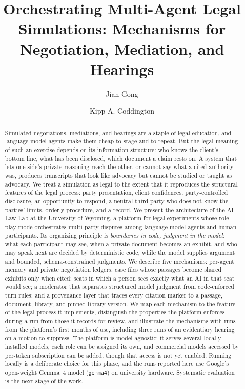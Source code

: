 \documentclass[acmsmall,screen,review]{acmart}
\newcommand{\lab}{AI Law Lab\xspace}
\newcommand{\code}[1]{\texttt{\small #1}}
\begin{document}
\title[Orchestrating Multi-Agent Legal Simulations]{Orchestrating Multi-Agent Legal Simulations: Mechanisms for Negotiation, Mediation, and Hearings}

\author{Jian Gong}
\author{Kipp A. Coddington}

\begin{abstract}
Simulated negotiations, mediations, and hearings are a staple of legal education, and language-model agents make them cheap to stage and to repeat. But the legal meaning of such an exercise depends on its information structure: who knows the client's bottom line, what has been disclosed, which document a claim rests on. A system that lets one side's private reasoning reach the other, or cannot say what a cited authority was, produces transcripts that look like advocacy but cannot be studied or taught as advocacy. We treat a simulation as legal to the extent that it reproduces the structural features of the legal process: party presentation, client confidences, party-controlled disclosure, an opportunity to respond, a neutral third party who does not know the parties' limits, orderly procedure, and a record. We present the architecture of the \lab at the University of Wyoming, a platform for legal experiments whose role-play mode orchestrates multi-party disputes among language-model agents and human participants. Its organizing principle is \emph{boundaries in code, judgment in the model}: what each participant may see, when a private document becomes an exhibit, and who may speak next are decided by deterministic code, while the model supplies argument and bounded, schema-constrained judgments. We describe five mechanisms: per-agent memory and private negotiation ledgers; case files whose passages become shared exhibits only when cited; seats in which a person sees exactly what an AI in that seat would see; a moderator that separates structured model judgment from code-enforced turn rules; and a provenance layer that traces every citation marker to a passage, document, library, and pinned library version. We map each mechanism to the feature of the legal process it implements, distinguish the properties the platform enforces during a run from those it records for review, and illustrate the mechanisms with runs from the platform's first months of use, including three runs of an evidentiary hearing on a motion to suppress. The platform is model-agnostic: it serves several locally installed models, each role can be assigned its own, and commercial models accessed by per-token subscription can be added, though that access is not yet enabled. Running locally is a deliberate choice for this phase, and the runs reported here use Google's open-weight Gemma~4 model (\code{gemma4}) on university hardware. Systematic evaluation is the next stage of the work.
\end{abstract}
\end{document}
